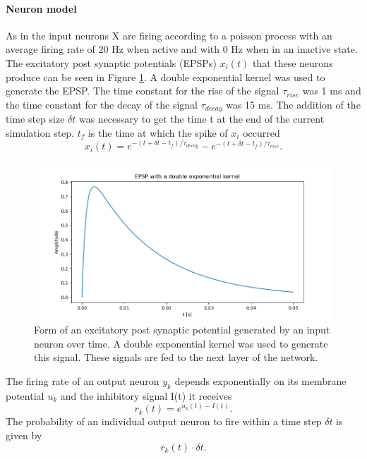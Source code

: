 \paragraph{Neuron model}

As in \citet{nessler} the input neurons X are firing according to a poisson process with an average firing rate of 20 Hz when active and with 0 Hz when in an inactive state. The excitatory post synaptic potentials (EPSPs) $x_i(t)$ that these neurons produce can be seen in Figure \ref{fig:XSpike}. A double exponential kernel was used to generate the EPSP. The time constant for the rise of the signal $\tau_{rise}$ was 1 ms and the time constant for the decay of the signal $\tau_{decay}$ was 15 ms. The addition of the time step size $\delta t$ was necessary to get the time t at the end of the current simulation step. $t_f$ is the time at which the spike of $x_i$ occurred
\begin{equation}
\label{eqn:EPSP}
x_i(t) = e^{-(t + \delta t - t_f) / \tau_{decay}} - e^{-(t + \delta t - t_f) / \tau_{rise}}.
\end{equation}


\begin{figure}
  \includegraphics[width=\linewidth]{figures/XSpike.png}
  \caption{Form of an excitatory post synaptic potential generated by an input neuron over time. A double exponential kernel was used to generate this signal. These signals are fed to the next layer of the network. }
  \label{fig:XSpike}
\end{figure}

The firing rate of an output neuron $y_k$ depends exponentially on its membrane potential $u_k$ and the inhibitory signal I(t) it receives 
\begin{equation}
\label{eqn:rk}
r_k(t) = e^{u_k(t) - I(t)}.
\end{equation}
The probability of an individual output neuron to fire within a time step $\delta t$ is given by
\begin{equation}
\label{eqn:rkdt}
r_k(t) \cdot \delta t.
\end{equation}

